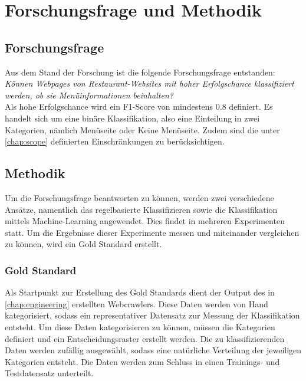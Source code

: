 \chapter{Forschungsfrage und Methodik}
\section{Forschungsfrage}
Aus dem Stand der Forschung ist die folgende Forschungsfrage entstanden:\\

\emph{Können Webpages von Restaurant-Websites mit hoher Erfolgschance klassifiziert werden, ob sie Menüinformationen beinhalten?}\\

Als hohe Erfolgschance wird ein F1-Score von mindestens 0.8 definiert.
Es handelt sich um eine binäre Klassifikation, also eine Einteilung in zwei Kategorien, nämlich \glqq Menüseite\grqq{} oder \glqq Keine Menüseite\grqq.
Zudem sind die unter \cref{chap:scope} definierten Einschränkungen zu berücksichtigen.
\section{Methodik}
Um die Forschungsfrage beantworten zu können, werden zwei verschiedene Ansätze, namentlich das regelbasierte Klassifizieren sowie die Klassifikation mittels Machine-Learning angewendet.
Dies findet in mehreren Experimenten statt.
Um die Ergebnisse dieser Experimente messen und miteinander vergleichen zu können, wird ein Gold Standard erstellt.
\subsection{Gold Standard}
Als Startpunkt zur Erstellung des Gold Standards dient der Output des in \cref{chap:engineering} erstellten Webcrawlers.
Diese Daten werden von Hand kategorisiert, sodass ein representativer Datensatz zur Messung der Klassifikation entsteht.
Um diese Daten kategorisieren zu können, müssen die Kategorien definiert und ein Entscheidungsraster erstellt werden.
Die zu klassifizierenden Daten werden zufällig ausgewählt, sodass eine natürliche Verteilung der jeweiligen Kategorien entsteht.
Die Daten werden zum Schluss in einen Trainings- und Testdatensatz unterteilt.
